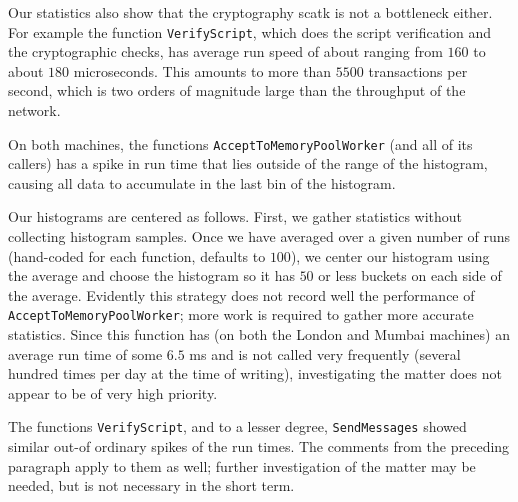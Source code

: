 \documentclass{article}
\begin{document}
Our statistics also show that the cryptography scatk is not a bottleneck either. For example the function \verb|VerifyScript|, which does the script verification and the cryptographic checks, has average run speed of about ranging from $160$ to about $180$ microseconds. This amounts to more than $5500$ transactions per second, which is two orders of magnitude large than the throughput of the network.



On both machines, the functions \verb|AcceptToMemoryPoolWorker| (and all of its callers) has a spike in run time that lies outside of the range of the histogram, causing all data to accumulate in the last bin of the histogram. 

Our histograms are centered as follows. First, we gather statistics without collecting histogram samples. Once we have averaged over a given number of runs (hand-coded for each function, defaults to $100$), we center our histogram using the average and choose the histogram so it has $50$ or less buckets on each side of the average. Evidently this strategy does not record well the performance of  \verb|AcceptToMemoryPoolWorker|; more work is required to gather more accurate statistics. Since this function has (on both the London and Mumbai machines) an average run time of some $6.5$ ms and is not called very frequently (several hundred times per day at the time of writing), investigating the matter does not appear to be of very high priority. 


The functions \verb|VerifyScript|, and to a lesser degree, \verb|SendMessages| showed similar out-of ordinary spikes of the run times. The comments from the preceding paragraph apply to them as well; further investigation of the matter may be needed, but is not necessary in the short term.
\end{document}
